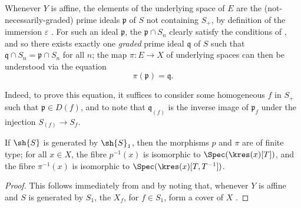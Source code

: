 \begin{remark}[8.3.7]
\label{II.8.3.7}
Whenever $Y$ is affine, the elements of the underlying space of $E$ are the (not-necessarily-graded) prime ideals $\mathfrak{p}$ of $S$ not containing $S_+$, by definition of the immersion $\varepsilon$ .
For such an ideal $\mathfrak{p}$, the $\mathfrak{p}\cap S_n$ clearly satisfy the conditions of , and so there exists exactly one \emph{graded} prime ideal $\mathfrak{q}$ of $S$ such that $\mathfrak{q}\cap S_n=\mathfrak{p}\cap S_n$ for all $n$;
the map $\pi:E\to X$ of underlying spaces can then be understood via the equation
\[
\label{II.8.3.7.1}
  \pi(\mathfrak{p}) = \mathfrak{q}.
\tag{8.3.7.1}
\]

Indeed, to prove this equation, it suffices to consider some homogeneous $f$ in $S_+$ such that $\mathfrak{p}\in D(f)$, and to note that $\mathfrak{q}_{(f)}$ is the inverse image of $\mathfrak{p}_f$ under the injection $S_{(f)}\to S_f$.
\end{remark}

\begin{corollary}[8.3.8]
\label{II.8.3.8}
If $\sh{S}$ is generated by $\sh{S}_1$, then the morphisms $p$ and $\pi$ are of finite type;
for all $x\in X$, the fibre $p^{-1}(x)$ is isomorphic to $\Spec(\kres(x)[T])$, and the fibre $\pi^{-1}(x)$ is isomorphic to $\Spec(\kres(x)[T,T^{-1}])$.
\end{corollary}

\begin{proof}
This follows immediately from  and  by noting that, whenever $Y$ is affine and $S$ is generated by $S_1$, the $X_f$, for $f\in S_1$, form a cover of $X$ .
\end{proof}

